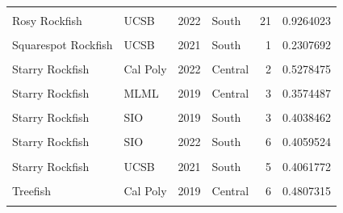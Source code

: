 \documentclass[
]{article}
\begin{document}
\begin{longtable}[t]{llrlrr}
\cellcolor{gray!6}{Rosy Rockfish} & \cellcolor{gray!6}{UCSB} & \cellcolor{gray!6}{2021} & \cellcolor{gray!6}{South} & \cellcolor{gray!6}{10} & \cellcolor{gray!6}{0.4068749}\\
Rosy Rockfish & UCSB & 2022 & South & 21 & 0.9264023\\
\cellcolor{gray!6}{Squarespot Rockfish} & \cellcolor{gray!6}{UCSB} & \cellcolor{gray!6}{2019} & \cellcolor{gray!6}{South} & \cellcolor{gray!6}{1} & \cellcolor{gray!6}{0.3409091}\\
\addlinespace
Squarespot Rockfish & UCSB & 2021 & South & 1 & 0.2307692\\
\cellcolor{gray!6}{Starry Rockfish} & \cellcolor{gray!6}{Cal Poly} & \cellcolor{gray!6}{2021} & \cellcolor{gray!6}{Central} & \cellcolor{gray!6}{2} & \cellcolor{gray!6}{0.5000000}\\
Starry Rockfish & Cal Poly & 2022 & Central & 2 & 0.5278475\\
\cellcolor{gray!6}{Starry Rockfish} & \cellcolor{gray!6}{HSU} & \cellcolor{gray!6}{2021} & \cellcolor{gray!6}{North} & \cellcolor{gray!6}{3} & \cellcolor{gray!6}{1.8690476}\\
Starry Rockfish & MLML & 2019 & Central & 3 & 0.3574487\\
\addlinespace
\cellcolor{gray!6}{Starry Rockfish} & \cellcolor{gray!6}{MLML} & \cellcolor{gray!6}{2022} & \cellcolor{gray!6}{Central} & \cellcolor{gray!6}{1} & \cellcolor{gray!6}{0.4434590}\\
Starry Rockfish & SIO & 2019 & South & 3 & 0.4038462\\
\cellcolor{gray!6}{Starry Rockfish} & \cellcolor{gray!6}{SIO} & \cellcolor{gray!6}{2021} & \cellcolor{gray!6}{South} & \cellcolor{gray!6}{1} & \cellcolor{gray!6}{0.6666667}\\
Starry Rockfish & SIO & 2022 & South & 6 & 0.4059524\\
\cellcolor{gray!6}{Starry Rockfish} & \cellcolor{gray!6}{UCSB} & \cellcolor{gray!6}{2019} & \cellcolor{gray!6}{South} & \cellcolor{gray!6}{3} & \cellcolor{gray!6}{0.7159091}\\
\addlinespace
Starry Rockfish & UCSB & 2021 & South & 5 & 0.4061772\\
\cellcolor{gray!6}{Starry Rockfish} & \cellcolor{gray!6}{UCSB} & \cellcolor{gray!6}{2022} & \cellcolor{gray!6}{South} & \cellcolor{gray!6}{9} & \cellcolor{gray!6}{0.8709291}\\
Treefish & Cal Poly & 2019 & Central & 6 & 0.4807315\\
\cellcolor{gray!6}{Treefish} & \cellcolor{gray!6}{Cal Poly} & \cellcolor{gray!6}{2021} & \cellcolor{gray!6}{Central} & \cellcolor{gray!6}{13} & \cellcolor{gray!6}{0.8749253}\\

\end{longtable}
\end{document}
